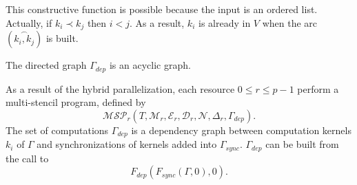 This constructive function is possible because the input is an ordered list. Actually, if $k_i\prec k_j$ then $i<j$. As a result, $k_i$ is already in $V$ when the arc $(\overset{\frown}{k_i,k_j})$ is built. 

\begin{myprop}
The directed graph $\Gamma_{dep}$ is an acyclic graph.
\end{myprop}


As a result of the hybrid parallelization, each resource $0 \leq r \leq p-1$ perform a multi-stencil program, defined by
\begin{equation*}
\mathcal{MSP}_r(T,\mathcal{M}_r,\mathcal{E}_r,\mathcal{D}_r,\mathcal{N},\Delta_r,\Gamma_{dep}).
\end{equation*}
The set of computations $\Gamma_{dep}$ is a dependency graph between computation kernels $k_i$ of $\Gamma$ and synchronizations of kernels added into $\Gamma_{sync}$. $\Gamma_{dep}$ can be built from the call to 
\begin{equation*}
F_{dep}(F_{sync}(\Gamma,0),0).
\end{equation*}

